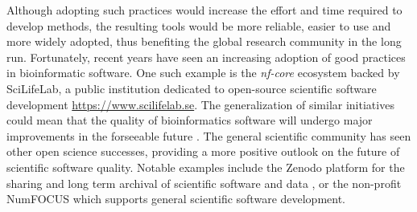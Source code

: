 Although adopting such practices would increase the effort and time required to develop methods, the resulting tools would be more reliable, easier to use and more widely adopted, thus benefiting the global research community in the long run. Fortunately, recent years have seen an increasing adoption of good practices in bioinformatic software. One such example is the \textit{nf-core} ecosystem backed by SciLifeLab, a public institution dedicated to open-source scientific software development \url{https://www.scilifelab.se}. The generalization of similar initiatives could mean that the quality of bioinformatics software will undergo major improvements in the forseeable future \cite{ewelsNfcoreFrameworkCommunitycurated2020,wrattenReproducibleScalableShareable2021}. The general scientific community has seen other open science successes, providing a more positive outlook on the future of scientific software quality. Notable examples include the Zenodo platform for the sharing and long term archival of scientific software and data \cite{ZenodoResearchShared}, or the non-profit NumFOCUS \cite{NumFOCUSNonprofitSupporting} which supports general scientific software development. 